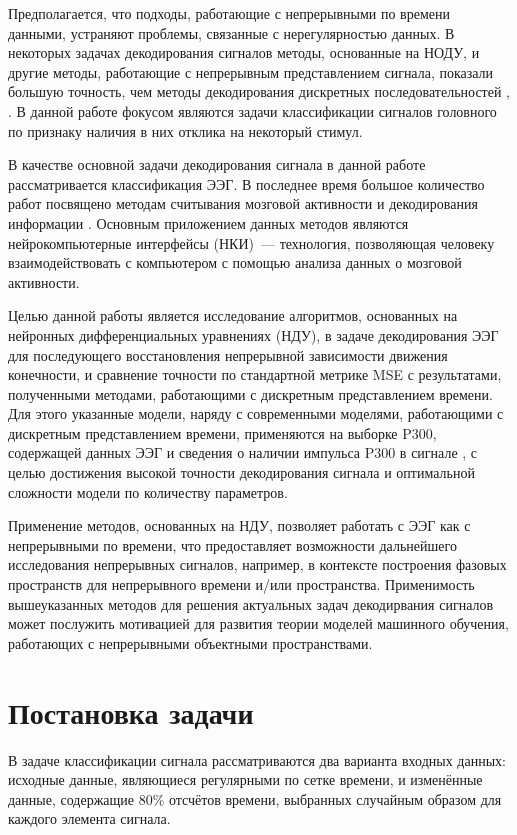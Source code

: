 \documentclass[a4paper, 12pt]{article} %
\begin{document}
Предполагается, что подходы, работающие с непрерывными по времени данными, устраняют проблемы, связанные с нерегулярностью данных. В некоторых задачах декодирования сигналов методы, основанные на НОДУ, и другие методы, работающие с непрерывным представлением сигнала, показали большую точность, чем методы декодирования дискретных последовательностей \cite{neural_ode}, \cite{cde}. В данной работе фокусом являются задачи классификации сигналов головного по признаку наличия в них отклика на некоторый стимул.

В качестве основной задачи декодирования сигнала в данной работе рассматривается классификация ЭЭГ. В последнее время большое количество работ посвящено методам считывания мозговой активности и декодирования информации \cite{Hu2018,Song2017,Loza2017,Eliseyev2016,Gaglianese2016,Bundy2016,Morishita2014, goncharenko}. Основным приложением данных методов являются нейрокомпьютерные интерфейсы (НКИ)~--- технология, позволяющая человеку взаимодействовать с компьютером с помощью анализа данных о мозговой активности.

Целью данной работы является исследование алгоритмов, основанных на нейронных дифференциальных уравнениях (НДУ), в задаче декодирования ЭЭГ для последующего восстановления непрерывной зависимости движения конечности, и сравнение точности по стандартной метрике MSE с результатами, полученными методами, работающими с дискретным представлением времени. Для этого указанные модели, наряду с современными моделями, работающими с дискретным представлением времени, применяются на выборке P300, содержащей данных ЭЭГ и сведения о наличии импульса P300 в сигнале \cite{p300}, с целью достижения
высокой точности декодирования сигнала и оптимальной сложности модели по
количеству параметров.

Применение методов, основанных на НДУ, позволяет работать с ЭЭГ как с непрерывными по времени, что предоставляет возможности дальнейшего исследования непрерывных сигналов, например, в контексте построения фазовых пространств для непрерывного времени и/или пространства. Применимость вышеуказанных методов для решения актуальных задач декодирвания сигналов может послужить мотивацией для развития теории моделей машинного обучения, работающих с непрерывными объектными пространствами.


\section{Постановка задачи}
    В задаче классификации сигнала рассматриваются два варианта входных данных: исходные данные, являющиеся регулярными по сетке времени, и изменённые данные, содержащие 80\% отсчётов времени, выбранных случайным образом для каждого элемента сигнала. 
    
\end{document}
